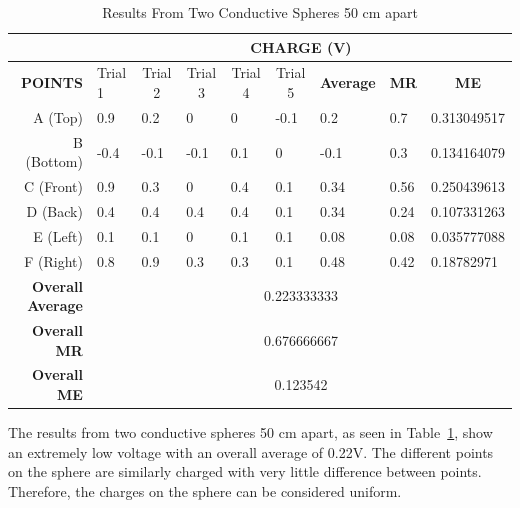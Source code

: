 \begin{table}[h]
    \caption{\label{tab:table1}Results From Two Conductive Spheres 50 cm apart}
    \centering
    \begin{tabular}{@{}rllllllll@{}}
    \toprule
    & \multicolumn{8}{c}{\textbf{CHARGE (V)}}\\ \midrule
    \textbf{POINTS} &
      Trial 1 &
      \multicolumn{1}{c}{Trial 2} &
      \multicolumn{1}{c}{Trial 3} &
      \multicolumn{1}{c}{Trial 4} &
      \multicolumn{1}{c}{Trial 5} &
      \multicolumn{1}{c}{\textbf{Average}} &
      \multicolumn{1}{c}{\textbf{MR}} &
      \multicolumn{1}{c}{\textbf{ME}} \\
    A (Top)                  & 0.9  & 0.2  & 0    & 0   & -0.1 & 0.2  & 0.7  & 0.313049517                     \\
    B (Bottom)               & -0.4 & -0.1 & -0.1 & 0.1 & 0    & -0.1 & 0.3  & 0.134164079                     \\
    C (Front)                & 0.9  & 0.3  & 0    & 0.4 & 0.1  & 0.34 & 0.56 & 0.250439613                     \\
    D (Back)                 & 0.4  & 0.4  & 0.4  & 0.4 & 0.1  & 0.34 & 0.24 & 0.107331263                     \\
    E (Left)                 & 0.1  & 0.1  & 0    & 0.1 & 0.1  & 0.08 & 0.08 & 0.035777088                     \\
    F (Right)                & 0.8  & 0.9  & 0.3  & 0.3 & 0.1  & 0.48 & 0.42 & 0.18782971                      \\
    \textbf{Overall Average} & \multicolumn{8}{c}{0.223333333}                                                 \\
    \textbf{Overall MR}      & \multicolumn{8}{c}{0.676666667}                                                 \\
    \textbf{Overall ME}      & \multicolumn{8}{c}{0.123542}                                                    \\ \bottomrule
    \end{tabular}
\end{table}
    
The results from two conductive spheres 50 cm apart, as seen in Table~\ref{tab:table1}, show an extremely low voltage with an overall average of 0.22V. The different points on the sphere are similarly charged with very little difference between points. Therefore, the charges on the sphere can be considered uniform.

\newpage

